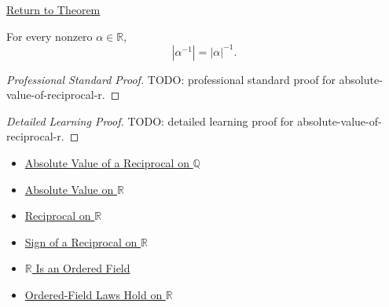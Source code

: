 \newpage
{}
\label{prf:absolute-value-of-reciprocal-r}

\begin{remark*}[Return]
\hyperref[thm:absolute-value-of-reciprocal-r]{Return to Theorem}
\end{remark*}

\begin{theorem*}
For every nonzero $\alpha\in\mathbb{R}$,
\[
|\alpha^{-1}|=|\alpha|^{-1}.
\]
\end{theorem*}

\begin{proof}[Professional Standard Proof]
\LRAProofBodyStart
TODO: professional standard proof for absolute-value-of-reciprocal-r.
\end{proof}

\begin{proof}[Detailed Learning Proof]
\LRAProofBodyStart
TODO: detailed learning proof for absolute-value-of-reciprocal-r.
\end{proof}

\begin{remark*}
\end{remark*}

\begin{dependencies}
\begin{itemize}
  \item \hyperref[thm:absolute-value-of-reciprocal-q]{Absolute Value of a Reciprocal on $\mathbb{Q}$}
  \item \hyperref[def:real-chapter-absolute-value-on-r]{Absolute Value on $\mathbb{R}$}
  \item \hyperref[def:reciprocal-on-r]{Reciprocal on $\mathbb{R}$}
  \item \hyperref[thm:sign-of-reciprocal-r]{Sign of a Reciprocal on $\mathbb{R}$}
  \item \hyperref[thm:r-is-an-ordered-field]{$\mathbb{R}$ Is an Ordered Field}
  \item \hyperref[cor:ordered-field-laws-on-r]{Ordered-Field Laws Hold on $\mathbb{R}$}
\end{itemize}
\end{dependencies}

\clearpage
